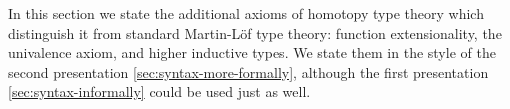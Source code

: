 \documentclass[12pt]{article}
\let\autoref\cref
\begin{document}
In this section we state the additional axioms of homotopy type theory which distinguish it from standard Martin-L\"{o}f type theory: function extensionality, the
univalence axiom, and higher inductive types. We state them in the style
of the second presentation \autoref{sec:syntax-more-formally}, although the first presentation \autoref{sec:syntax-informally} could be used just as well.
\end{document}
